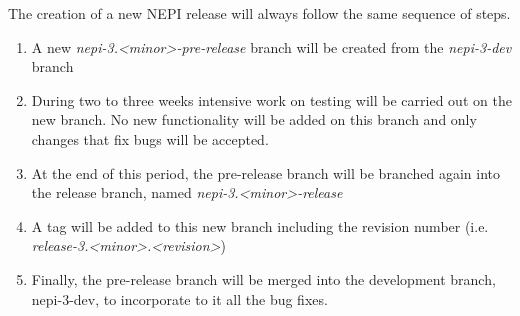 The creation of a new NEPI release will always follow the same sequence of steps.

\begin{enumerate}
  \item A new \emph{nepi-3.<minor>-pre-release} branch will be created from the \emph{nepi-3-dev} branch
  \item During two to three weeks intensive work on testing will be carried out on the new branch. No new functionality will be added on this branch and only changes that fix bugs will be accepted.
  \item At the end of this period, the pre-release branch will be branched again into the release branch, named \emph{nepi-3.<minor>-release}
  \item A tag will be added to this new branch including the revision number (i.e. \emph{release-3.<minor>.<revision>})
  \item Finally, the pre-release branch will be merged into the development branch, nepi-3-dev, to incorporate to it all the bug fixes.
\end{enumerate}


